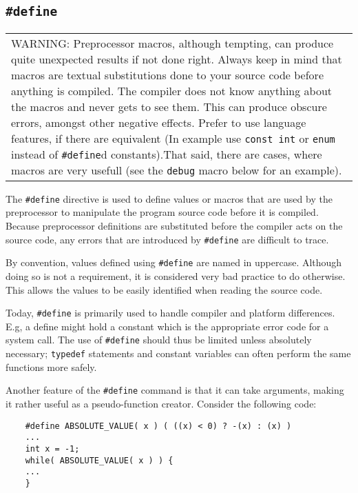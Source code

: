 \subsection{\texttt{\#define}}

\begin{table}[H]
	\begin{tabular}{ p{} }
		 WARNING: Preprocessor macros, although tempting, can produce quite unexpected results if not done right. Always keep in mind that macros are textual substitutions done to your source code before anything is compiled. The compiler does not know anything about the macros and never gets to see them. This can produce obscure errors, amongst other negative effects. Prefer to use language features, if there are equivalent (In example use \texttt{const int} or \texttt{enum} instead of \texttt{\#define}d constants).That said, there are cases, where macros are very usefull (see the \texttt{debug} macro below for an example). \\
	\end{tabular}
\end{table}

The \texttt{\#define} directive is used to define values or macros that are used by the preprocessor to manipulate the program source code before it is compiled. Because preprocessor definitions are substituted before the compiler acts on the source code, any errors that are introduced by \texttt{\#define} are difficult to trace. 

By convention, values defined using \texttt{\#define} are named in uppercase. Although doing so is not a requirement, it is considered very bad practice to do otherwise. This allows the values to be easily identified when reading the source code.

Today, \texttt{\#define} is primarily used to handle compiler and platform differences. E.g, a define might hold a constant which is the appropriate error code for a system call. The use of \texttt{\#define} should thus be limited unless absolutely necessary; \texttt{typedef} statements and constant variables can often perform the same functions more safely. 

Another feature of the \texttt{\#define} command is that it can take arguments, making it rather useful as a pseudo-function creator. Consider the following code: 

\begin{verbatim}
	#define ABSOLUTE_VALUE( x ) ( ((x) < 0) ? -(x) : (x) )
	...
	int x = -1;
	while( ABSOLUTE_VALUE( x ) ) {
	...
	}
\end{verbatim}
		
